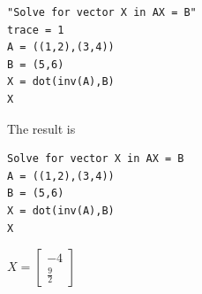 \begin{Verbatim}[formatcom=\color{blue},samepage=true]
"Solve for vector X in AX = B"
trace = 1
A = ((1,2),(3,4))
B = (5,6)
X = dot(inv(A),B)
X
\end{Verbatim}

The result is

\begin{Verbatim}
Solve for vector X in AX = B
A = ((1,2),(3,4))
B = (5,6)
X = dot(inv(A),B)
X
\end{Verbatim}

$X=\begin{bmatrix}-4\\ \frac{9}{2}\end{bmatrix}$
